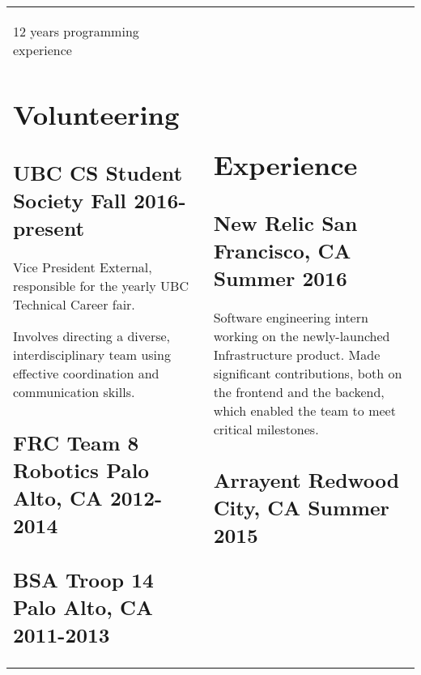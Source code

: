 \documentclass[letterpaper]{article}
\newlength{\leftcol}
\newlength{\rightcol}
\newcommand{\subtitle}{\normalfont\sffamily\color{black}\large}
\begin{document}
\begin{tabularx}{\textwidth}{@{}p{\leftcol} p{\rightcol}}
12 years programming experience

\vspace*{1.7\baselineskip}

\section*{Volunteering}

\subsection*{UBC CS Student Society \newline\subtitle Fall 2016-present}

Vice President External, responsible for the yearly UBC Technical Career fair.

\vspace*{.5\baselineskip}

Involves directing a diverse, interdisciplinary team using effective
coordination and communication skills.

\subsection*{FRC Team 8 Robotics \newline\subtitle Palo Alto, CA 2012-2014}

\subsection*{BSA Troop 14 \newline\subtitle Palo Alto, CA 2011-2013}

&

\vspace*{2pt}

\section*{Experience}


\subsection*{New Relic \subtitle San Francisco, CA Summer 2016}

Software engineering intern working on the newly-launched Infrastructure
product. Made significant contributions, both on the frontend and the backend,
which enabled the team to meet critical milestones.

\subsection*{Arrayent \subtitle Redwood City, CA Summer 2015}


\end{tabularx}
\end{document}
